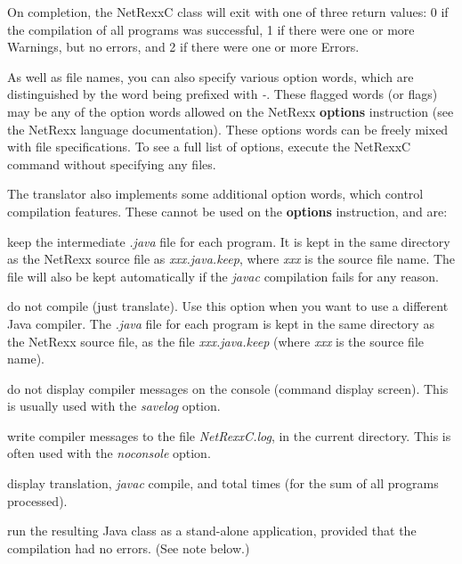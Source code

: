 On completion, the NetRexxC class will exit with one of three return
values: 0 if the compilation of all programs was successful, 1 if there
were one or more Warnings, but no errors, and 2 if there were one or
more Errors.

As well as file names, you can also specify various option words, which
are distinguished by the word being prefixed with \emph{-}.  These
flagged words (or flags) may be any of the option words allowed
on the NetRexx \textbf{options} instruction (see the NetRexx language
documentation).  These options words can be freely mixed with file
specifications.  To see a full list of options, execute the NetRexxC
command without specifying any files.

The translator also implements some additional option words, which
control compilation features.  These cannot be used on the
\textbf{options} instruction, and are:
\begin{description}
\item[-keep]
keep the intermediate \emph{.java} file for each program.  It is kept in
the same directory as the NetRexx source file as \emph{xxx.java.keep},
where \emph{xxx} is the source file name.  The file will also be kept
automatically if the \emph{javac} compilation fails for any reason.
\item[-nocompile]
do not compile (just translate).  Use this option when you want to use a
different Java compiler.  The \emph{.java} file for each program is kept
in the same directory as the NetRexx source file, as the
file \emph{xxx.java.keep} (where \emph{xxx} is the source file name).
\item[-noconsole]
do not display compiler messages on the console (command display
screen).  This is usually used with the \emph{savelog} option.
\item[-savelog]
write compiler messages to the file \emph{NetRexxC.log}, in the current
directory.
This is often used with the \emph{noconsole} option.
\item[-time]
display translation, \emph{javac} compile, and total times (for the sum
of all programs processed).
\item[-run]
run the resulting Java class as a stand-alone application, provided that
the compilation had no errors.
(See note below.)
\end{description}

